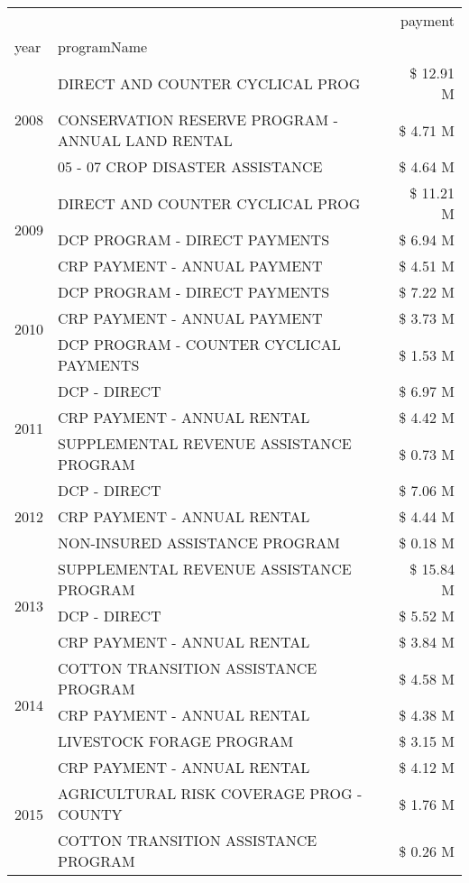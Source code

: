 \begin{tabular}{llr}
\toprule
 &  & payment \\
year & programName &  \\
\midrule
\multirow[t]{3}{*}{2008} & DIRECT AND COUNTER CYCLICAL PROG & \$ 12.91 M \\
 & CONSERVATION RESERVE PROGRAM - ANNUAL LAND RENTAL & \$ 4.71 M \\
 & 05 - 07 CROP DISASTER ASSISTANCE & \$ 4.64 M \\
\cline{1-3}
\multirow[t]{3}{*}{2009} & DIRECT AND COUNTER CYCLICAL PROG & \$ 11.21 M \\
 & DCP PROGRAM - DIRECT PAYMENTS & \$ 6.94 M \\
 & CRP PAYMENT - ANNUAL PAYMENT & \$ 4.51 M \\
\cline{1-3}
\multirow[t]{3}{*}{2010} & DCP PROGRAM - DIRECT PAYMENTS & \$ 7.22 M \\
 & CRP PAYMENT - ANNUAL PAYMENT & \$ 3.73 M \\
 & DCP PROGRAM - COUNTER CYCLICAL PAYMENTS & \$ 1.53 M \\
\cline{1-3}
\multirow[t]{3}{*}{2011} & DCP - DIRECT & \$ 6.97 M \\
 & CRP PAYMENT - ANNUAL RENTAL & \$ 4.42 M \\
 & SUPPLEMENTAL REVENUE ASSISTANCE PROGRAM & \$ 0.73 M \\
\cline{1-3}
\multirow[t]{3}{*}{2012} & DCP - DIRECT & \$ 7.06 M \\
 & CRP PAYMENT - ANNUAL RENTAL & \$ 4.44 M \\
 & NON-INSURED ASSISTANCE PROGRAM & \$ 0.18 M \\
\cline{1-3}
\multirow[t]{3}{*}{2013} & SUPPLEMENTAL REVENUE ASSISTANCE PROGRAM & \$ 15.84 M \\
 & DCP - DIRECT & \$ 5.52 M \\
 & CRP PAYMENT - ANNUAL RENTAL & \$ 3.84 M \\
\cline{1-3}
\multirow[t]{3}{*}{2014} & COTTON TRANSITION ASSISTANCE PROGRAM & \$ 4.58 M \\
 & CRP PAYMENT - ANNUAL RENTAL & \$ 4.38 M \\
 & LIVESTOCK FORAGE PROGRAM & \$ 3.15 M \\
\cline{1-3}
\multirow[t]{3}{*}{2015} & CRP PAYMENT - ANNUAL RENTAL & \$ 4.12 M \\
 & AGRICULTURAL RISK COVERAGE PROG - COUNTY & \$ 1.76 M \\
 & COTTON TRANSITION ASSISTANCE PROGRAM & \$ 0.26 M \\

\end{tabular}
